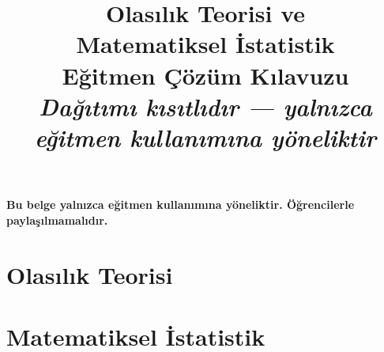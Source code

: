 \documentclass[12pt, a4paper, twoside]{book}
\title{%
  {\Huge\bfseries Olasılık Teorisi ve}\\[4pt]
  {\Huge\bfseries Matematiksel İstatistik}\\[12pt]
  {\LARGE\color{red!70!black}\bfseries Eğitmen Çözüm Kılavuzu}\\[6pt]
  {\large\itshape Dağıtımı kısıtlıdır --- yalnızca eğitmen kullanımına yöneliktir}%
}
\author{}
\date{}
\begin{document}
\frontmatter
\maketitle

{\color{red!70!black}\bfseries\large
Bu belge yalnızca eğitmen kullanımına yöneliktir.
Öğrencilerle paylaşılmamalıdır.
}
\vspace{1cm}

\tableofcontents

\mainmatter

\part{Olasılık Teorisi}













\part{Matematiksel İstatistik}










\appendix








\backmatter
\end{document}
